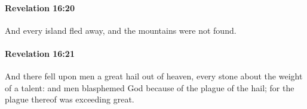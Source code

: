 		\paragraph{Revelation 16:20} %
			\label{REVELATIONNT-16-20}

			And every island fled away, and the mountains were not found.

			\begin{framed}
			\scriptsize
				\begin{compactdesc}
					\item[SBLG] 
				\end{compactdesc}
			\end{framed}

		\paragraph{Revelation 16:21} %
			\label{REVELATIONNT-16-21}

			And there fell upon men a great hail out of heaven, every stone about the weight of a talent: and men blasphemed God because of the plague of the hail; for the plague thereof was exceeding great.

